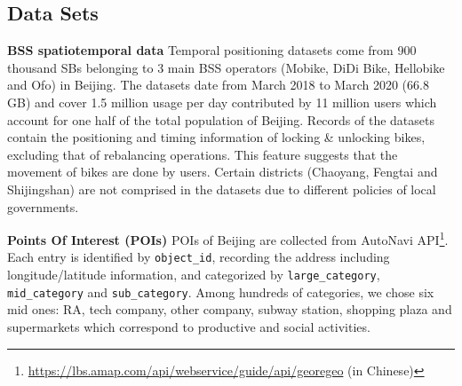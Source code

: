 \documentclass[preprints,ijgi,submit,moreauthors]{Definitions/mdpi}
\begin{document}
\subsection{Data Sets}
\textbf{BSS spatiotemporal data} Temporal positioning datasets come from 900 thousand SBs belonging to 3 main BSS operators (Mobike, DiDi Bike, Hellobike and Ofo) in Beijing.
The datasets date from March 2018 to March 2020 (66.8 GB) and cover 1.5 million usage per day contributed by 11 million users which account for one half of the total population of Beijing.
Records of the datasets contain the positioning and timing information of locking \& unlocking bikes, excluding that of rebalancing operations.
This feature suggests that the movement of bikes are done by users.
Certain districts (Chaoyang, Fengtai and Shijingshan) are not comprised in the datasets due to different policies of local governments.

\textbf{Points Of Interest (POIs)} POIs of Beijing are collected from AutoNavi API\footnote{\url{https://lbs.amap.com/api/webservice/guide/api/georegeo} (in Chinese)}.
Each entry is identified by \texttt{object\_id}, recording the address including longitude/latitude information, and categorized by \texttt{large\_category}, \texttt{mid\_category} and \texttt{sub\_category}.
Among hundreds of categories, we chose six mid ones: RA, tech company, other company, subway station, shopping plaza and supermarkets which correspond to productive and social activities.
\end{document}
